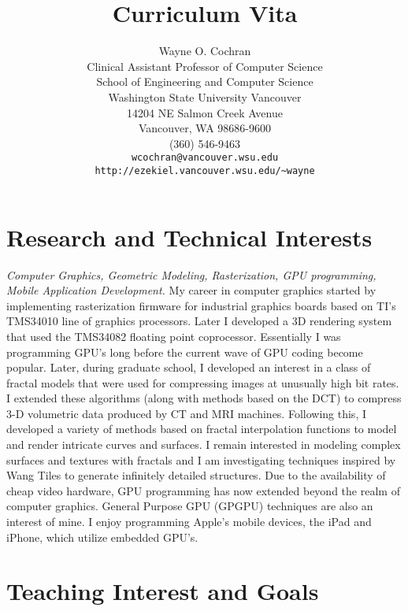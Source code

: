 \documentclass[10pt]{article}
\title{Curriculum Vita}
\author{Wayne O. Cochran\\
       Clinical Assistant Professor of Computer Science\\
       School of Engineering and Computer Science\\
       Washington State University Vancouver\\
       14204 NE Salmon Creek Avenue\\
       Vancouver, WA 98686-9600\\
       (360) 546-9463\\
       {\tt wcochran@vancouver.wsu.edu} \\
       {\tt http://ezekiel.vancouver.wsu.edu/\~{}wayne}}
\begin{document}
\maketitle




\section*{Research and Technical Interests}

{\em Computer Graphics, Geometric Modeling, Rasterization, 
GPU programming, Mobile Application Development.}
My career in computer graphics started by 
implementing rasterization firmware
for industrial graphics boards based on
TI's TMS34010 line of graphics processors.
Later I developed a 3D rendering system
that used the TMS34082 floating  point coprocessor.
Essentially I was programming GPU's long before
the current wave of GPU coding become popular.
Later, during graduate school, I developed an interest
in a class of fractal models that were used for compressing
images at unusually high bit rates. I extended these
algorithms (along with methods based on the DCT)
to compress 3-D volumetric data produced by CT
and MRI machines. Following this, I developed a variety of methods
based on fractal interpolation functions to model
and render intricate curves and surfaces.
I remain interested in modeling 
complex surfaces and textures with fractals and I am
investigating techniques inspired by
Wang Tiles to generate infinitely detailed structures.
Due to the availability of cheap video hardware,
GPU programming
has now extended beyond the realm of computer graphics.
General Purpose GPU (GPGPU) techniques are also
an interest of mine.
I enjoy programming Apple's mobile devices, the iPad and iPhone,
which utilize embedded GPU's.

\section*{Teaching Interest and Goals}
\end{document}
